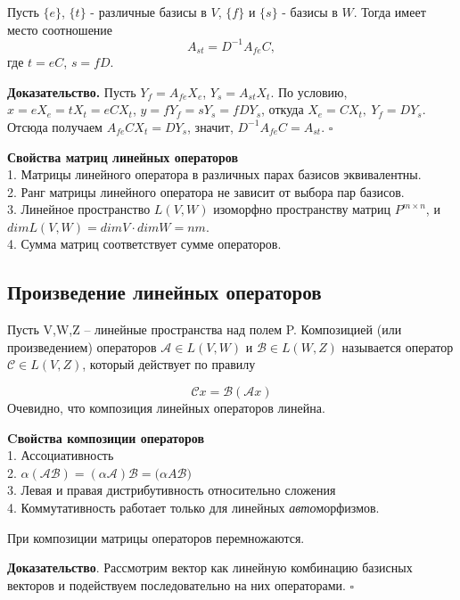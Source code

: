 \begin{theor}\label{basis_operators}
Пусть $\{e\}$, $\{t\}$ - различные базисы в $V$, $\{f\}$ и $\{s\}$ - базисы
в $W$. Тогда имеет место соотношение $$A_{st}=D^{-1}A_{fe}C,$$ где $t=eC$,
$s=fD$.
\end{theor}
\textbf{Доказательство.} Пусть $Y_f=A_{fe}X_e$, $Y_s=A_{st}X_t$. По условию,
$x=eX_e=tX_t=eCX_t$,  $y=fY_f=sY_s=fDY_s$, откуда $X_e=CX_t,~Y_f=DY_s$. 
Отсюда получаем $A_{fe}CX_t=DY_s$, значит, $D^{-1}A_{fe}C=A_{st}$. $\square$

\textbf{Свойства матриц линейных операторов}\\
1. Матрицы линейного оператора в различных парах базисов эквивалентны.\\
2. Ранг матрицы линейного оператора не зависит от выбора пар базисов.\\
3. Линейное пространство $L(V,W)$ изоморфно пространству матриц 
$P^{m\times n}$, и $dimL(V,W)= dimV\cdot dimW=nm$.\\
4. Сумма матриц соответствует сумме операторов.

\subsection{Произведение линейных операторов}
\begin{defin}
Пусть V,W,Z – линейные пространства над полем
P. Композицией (или произведением) операторов $\mathcal A\in L(V,W)$ и
$\mathcal B\in L(W,Z)$ называется оператор $\mathcal C\in L(V,Z)$, который
действует по правилу
\end{defin}
$$\mathcal Cx=\mathcal B(\mathcal Ax)$$
Очевидно, что композиция линейных операторов линейна.

\textbf{Cвойства композиции операторов}\\
1. Ассоциативность\\
2. $\alpha(\mathcal A\mathcal B)=(\alpha\mathcal A)\mathcal B=\mathcal
(\alpha A\mathcal B)$\\
3. Левая и правая дистрибутивность относительно сложения\\
4. Коммутативность работает только для линейных \textit{авто}морфизмов.
\begin{theor}
При композиции матрицы операторов перемножаются.
\end{theor}
\textbf{Доказательство}. Рассмотрим вектор как линейную комбинацию базисных 
векторов и подействуем последовательно на них операторами. $\square$\\

